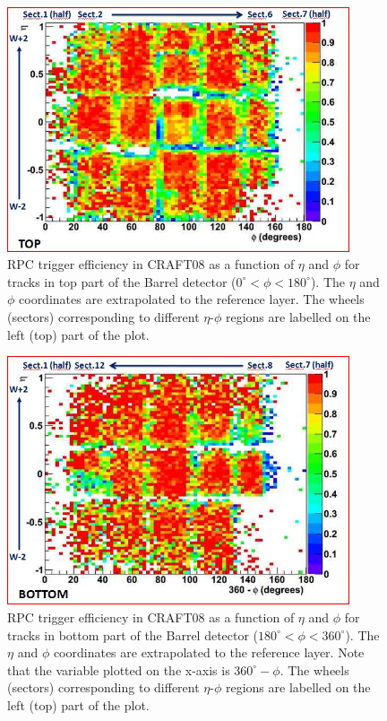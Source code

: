 \begin{figure}[hbtp]
  \begin{center}
     \includegraphics[width=0.9\textwidth]{eff_eta_phi_top_08_new}
      \hspace{1cm}
      \caption{RPC trigger efficiency in CRAFT08 as a function of $\eta$ and $\phi$ 
      for tracks in top part of the Barrel detector 
      ($ 0^\circ < \phi < 180^\circ $). The $\eta$ and $\phi$
      coordinates are extrapolated to the reference layer.
      The wheels (sectors) corresponding to different $\eta$-$\phi$
      regions are labelled on the left (top) part of the plot.
      }
    \label{fig:eff_eta_phi_top_08}
  \end{center}
\end{figure}

\begin{figure}[hbtp]
     \begin{center}
      \includegraphics[width=0.9\textwidth]{eff_eta_phi_bot_08_new}
      \hspace{1cm}
      \caption{RPC trigger efficiency in CRAFT08 as a function of $\eta$ and $\phi$ 
      for tracks in bottom part of the Barrel detector 
      ($ 180^\circ < \phi < 360^\circ $). The $\eta$ and $\phi$ coordinates are 
      extrapolated to the reference layer. 
      Note that the variable plotted on the x-axis is 
      $360^\circ - \phi$. The wheels (sectors) corresponding to different $\eta$-$\phi$
      regions are labelled on the left (top) part of the plot.
      }
    \label{fig:eff_eta_phi_bot_08}
  \end{center}
\end{figure}

